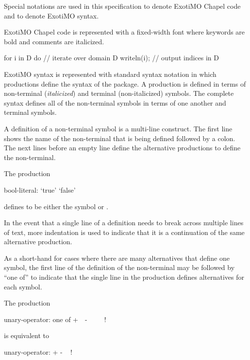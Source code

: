 \label{Notation}

Special notations are used in this specification to denote ExotiMO Chapel code
and to denote ExotiMO syntax.

ExotiMO Chapel code is represented with a fixed-width font where keywords are
bold and comments are italicized.
\begin{example}
\begin{chapel}
for i in D do   // iterate over domain D
  writeln(i);   // output indices in D
\end{chapel}
\end{example}

ExotiMO syntax is represented with standard syntax notation in which
productions define the syntax of the package.  A production is
defined in terms of non-terminal ({\it italicized}) and terminal
(non-italicized) symbols.  The complete syntax defines all of the
non-terminal symbols in terms of one another and terminal symbols.

A definition of a non-terminal symbol is a multi-line construct.  The
first line shows the name of the non-terminal that is being defined
followed by a colon.  The next lines before an empty line define the
alternative productions to define the non-terminal.
\begin{example}
The production
\begin{syntax_donotcollect}
bool-literal:
  `true'
  `false'
\end{syntax_donotcollect}
defines  to be either the symbol  or
.
\end{example}
In the event that a single line of a definition needs to break across
multiple lines of text, more indentation is used to indicate that it
is a continuation of the same alternative production.

As a short-hand for cases where there are many alternatives that
define one symbol, the first line of the definition of the
non-terminal may be followed by ``one of'' to indicate that the single
line in the production defines alternatives for each symbol.
\begin{example}
The production
\begin{syntax_donotcollect}
unary-operator: one of
  + $ $ $ $ - $ $ $ $ ~ $ $ $ $ !
\end{syntax_donotcollect}
is equivalent to
\begin{syntax_donotcollect}
unary-operator:
  +
  -
  ~
  !
\end{syntax_donotcollect}
\end{example}


